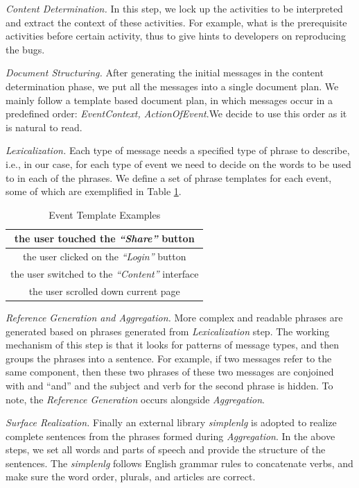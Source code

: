 \documentclass[10pt,conference]{IEEEtran}
\begin{document}
\emph{Content Determination.} In this step, we lock up the activities to be interpreted and extract the context of these activities. For example,
what is the prerequisite activities before certain activity, thus to give hints to developers on reproducing the bugs.

\emph{Document Structuring.} After generating the initial messages in the content determination phase, we put all the messages into
a single document plan. We mainly follow a template based document plan, in which messages occur in a predefined order:
\emph{EventContext, ActionOfEvent}.We decide to use this order as it is natural to read. 

\emph{Lexicalization.} Each type of message needs a specified type of phrase to describe, i.e., in our case, for each type of event
we need to decide on the words to be used to in each of the phrases.
We define a set of phrase templates for each event, some of which are exemplified in Table \ref{tab:eventTemplate}.

\begin{table}[!htbp]
\centering
\small
\caption{Event Template Examples}
\begin{tabular}{|c|} \hline
the user touched the \emph{``Share''} button\\ \hline
the user clicked on the \emph{``Login''} button\\ \hline
the user switched to the \emph{``Content''} interface\\ \hline
the user scrolled down current page\\ \hline
\end{tabular}
\label{tab:eventTemplate}
\end{table}

\emph{Reference Generation and Aggregation.} More complex and readable phrases are generated based on phrases generated
from \emph{Lexicalization} step. The working mechanism of this step is that it looks for patterns of message types, and then groups
the phrases into a sentence. For example, if two messages refer to the same component, then these two phrases of these two
messages are conjoined with and ``and'' and the subject and verb for the second phrase is hidden.  To note, the \emph{Reference Generation}
occurs alongside \emph{Aggregation}.

\emph{Surface Realization.} Finally an external library \emph{simplenlg} \cite{gatt2009simplenlg} is adopted to realize complete sentences from the
phrases formed during \emph{Aggregation}. In the above steps, we set all words and parts of speech and provide the structure of the sentences.
The \emph{simplenlg} follows English grammar rules to concatenate verbs, and make sure the word order, plurals, and articles are correct. 
\end{document}
